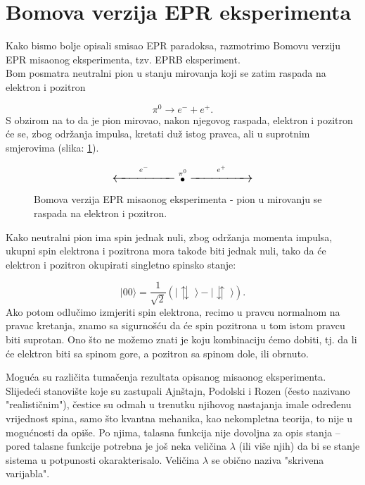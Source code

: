 \section{Bomova verzija EPR eksperimenta}

Kako bismo bolje opisali smisao EPR paradoksa, razmotrimo Bomovu verziju EPR misaonog eksperimenta, tzv. EPRB eksperiment.\\

Bom posmatra neutralni pion u stanju mirovanja koji se zatim raspada na elektron i pozitron

\begin{equation}
  \pi^0 \rightarrow e^- + e^+.
\end{equation}
S obzirom na to da je pion mirovao, nakon njegovog raspada, elektron i pozitron će se, zbog odr\v zanja impulsa, kretati du\v z istog pravca, ali u suprotnim smjerovima (slika: \ref{fig:pion_decay}).

\begin{figure}[H]
  \[
    \Large{
      \overset{e^-}{\xleftarrow{\hspace{2cm}}}
      \overset{\pi^0}{\bullet}
      \overset{e^+}{\xrightarrow{\hspace{2cm}}}
    }
  \]
  \caption{Bomova verzija EPR misaonog eksperimenta - pion u mirovanju se raspada na elektron i pozitron.}
  \label{fig:pion_decay}
\end{figure}


Kako neutralni pion ima spin jednak nuli, zbog održanja momenta impulsa, ukupni spin elektrona i pozitrona mora takođe biti jednak nuli,
tako da će elektron i pozitron okupirati singletno spinsko stanje:

\begin{equation}
  | 00 \rangle = \frac{1}{\sqrt2}(| \updownarrows \; \rangle - | \downuparrows \; \rangle). \label{eq:singlet_state}
\end{equation}
Ako potom odlučimo izmjeriti spin elektrona, recimo u pravcu normalnom na pravac kretanja, znamo sa sigurnošću da će spin pozitrona u tom istom pravcu biti suprotan.
Ono što ne možemo znati je koju kombinaciju ćemo dobiti, tj. da li će elektron biti sa spinom gore, a pozitron sa spinom dole, ili obrnuto.

Moguća su različita tumačenja rezultata opisanog misaonog eksperimenta.
Slijedeći stanovište koje su zastupali Ajnštajn, Podolski i Rozen (često nazivano "realističnim"), čestice su odmah u trenutku njihovog nastajanja imale određenu vrijednost spina, samo što kvantna mehanika, kao nekompletna teorija, to nije u mogućnosti da opiše.
Po njima, talasna funkcija nije dovoljna za opis stanja – pored talasne funkcije potrebna je još neka veličina $\lambda$ (ili više njih) da bi se stanje sistema u potpunosti okarakterisalo. Veličina $\lambda$ se obično naziva "skrivena varijabla".

